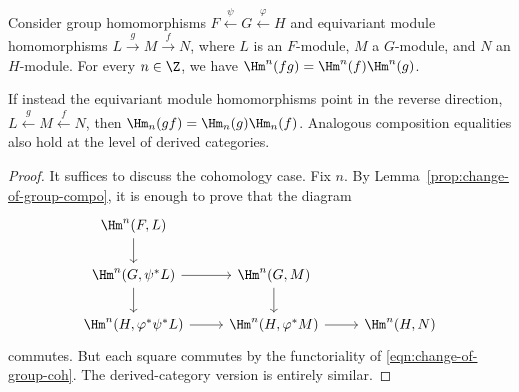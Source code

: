 \begin{proposition}
\label{prop:change-of-group-composite}
	Consider group homomorphisms
	$F\xleftarrow{\psi}G\xleftarrow{\varphi}H$ and equivariant module
	homomorphisms $L\xrightarrow{g}M\xrightarrow{f}N$, where $L$ is an
	$F$-module, $M$ a $G$-module, and $N$ an $H$-module. For every
	$n\in\Z$, we have $\Hm^n(fg)=\Hm^n(f)\Hm^n(g)$.

	If instead the equivariant module homomorphisms point in the reverse
	direction, $L\xleftarrow{g}M\xleftarrow{f}N$, then
	$\Hm_n(gf)=\Hm_n(g)\Hm_n(f)$. Analogous composition equalities also hold
	at the level of derived categories.
\end{proposition}
\begin{proof}
	It suffices to discuss the cohomology case. Fix $n$. By
	Lemma~\ref{prop:change-of-group-compo}, it is enough to prove that the
	diagram
	\[\begin{tikzcd}
		\Hm^n(F, L) \arrow[d] & & \\
		\Hm^n(G, \psi^* L) \arrow[r] \arrow[d] & \Hm^n(G, M) \arrow[d] & \\
		\Hm^n(H, \varphi^* \psi^* L) \arrow[r] & \Hm^n(H, \varphi^* M) \arrow[r] & \Hm^n(H, N)
	\end{tikzcd}\]
	commutes. But each square commutes by the functoriality of
	\eqref{eqn:change-of-group-coh}. The derived-category version is entirely
	similar.
\end{proof}

